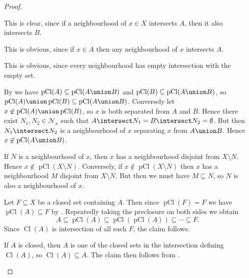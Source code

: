 \documentclass[article, a4paper, 11pt, oneside]{memoir}
\numberwithin{equation}{chapter}
\newcommand{\calN}{\mathcal{N}}
\newcommand{\nhoods}[1]{\calN_{#1}}
\newcommand{\pCl}[1]{\operatorname{pCl}(#1)}
\renewcommand{\closure}[1]{\operatorname{Cl}(#1)}
\begin{document}
\begin{proof}
    \begin{proofsec}
        \item[Proof of \subcref{enum:preclosure-increasing}]
        This is clear, since if a neighbourhood of $x \in X$ intersects $A$, then it also intersects $B$.
        
        \item[Proof of \subcref{enum:preclosure-extensive}]
        This is obvious, since if $x \in A$ then any neighbourhood of $x$ intersects $A$.
    
        \item[Proof of \subcref{enum:preclosure-nullary-unions}]
        This is obvious, since every neighbourhood has empty intersection with the empty set.
    
        \item[Proof of \subcref{enum:preclosure-binary-unions}]
        By  we have $\pCl{A} \subseteq \pCl{A \union B}$ and $\pCl{B} \subseteq \pCl{A \union B}$, so $\pCl{A} \union \pCl{B} \subseteq \pCl{A \union B}$. Conversely let $x \not\in \pCl{A} \union \pCl{B}$, so $x$ is both separated from $A$ and $B$. Hence there exist $N_1,N_2 \in \nhoods{x}$ such that $A \intersect N_1 = B \intersect N_2 = \emptyset$. But then $N_1 \intersect N_2$ is a neighbourhood of $x$ separating $x$ from $A \union B$. Hence $x \not\in \pCl{A \union B}$.
        
        \item[Proof of \subcref{enum:preclosure-characterisation-of-nhoods}]
        If $N$ is a neighbourhood of $x$, then $x$ has a neighbourhood disjoint from $X \setminus N$. Hence $x \not\in \pCl{X \setminus N}$. Conversely, if $x \not\in \pCl{X \setminus N}$ then $x$ has a neighbourhood $M$ disjoint from $X \setminus N$. But then we must have $M \subseteq N$, so $N$ is also a neighbourhood of $x$.

        \item[Proof of \subcref{enum:preclosure-inclusion-series}]
        Let $F \subseteq X$ be a closed set containing $A$. Then since $\pCl{F} = F$ we have $\pCl{A} \subseteq F$ by . Repeatedly taking the preclosure on both sides we obtain
        \begin{equation*}
            A
                \subseteq \pCl{A}
                \subseteq \pCl{\pCl{A}}
                \subseteq \cdots
                \subseteq F.
        \end{equation*}
        Since $\closure{A}$ is intersection of all such $F$, the claim follows.

        \item[Proof of \subcref{enum:preclosure-equals-closure}]
        If $A$ is closed, then $A$ is one of the closed sets in the intersection defining $\closure{A}$, so $\closure{A} \subseteq A$. The claim then follows from .
    \end{proofsec}
\end{proof}
\end{document}
